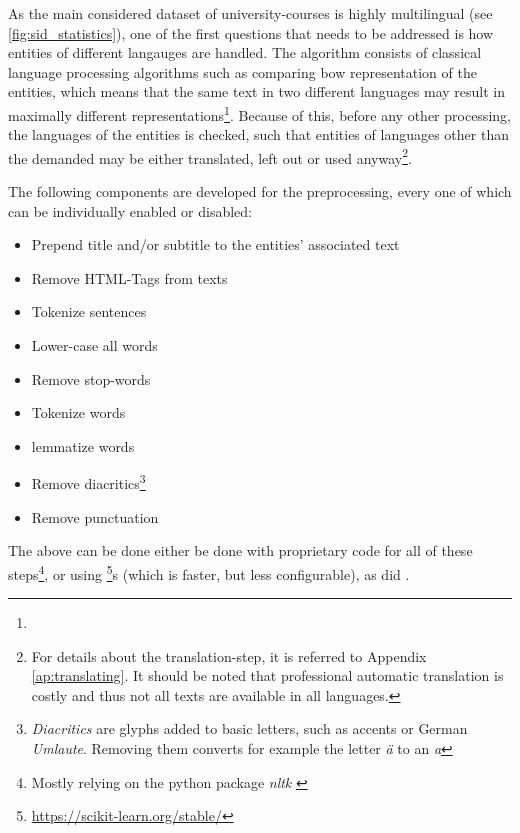 As the main considered dataset of university-courses is highly multilingual (see \autoref{fig:sid_statistics}), one of the first questions that needs to be addressed is how entities of different langauges are handled. The algorithm consists of classical language processing algorithms such as comparing \gls{bow} representation of the entities, which means that the same text in two different languages may result in maximally different representations\footnote{}. Because of this, before any other processing, the languages of the entities is checked, such that entities of languages other than the demanded may be either translated, left out or used anyway\footnote{For details about the translation-step, it is referred to Appendix \ref{ap:translating}. It should be noted that professional automatic translation is costly and thus not all texts are available in all languages.}.


The following components are developed for the preprocessing, every one of which can be individually enabled or disabled:
\begin{itemize}
	\item Prepend title and/or subtitle to the entities' associated text 
	\item Remove HTML-Tags from texts 
	\item Tokenize sentences 
	\item Lower-case all words
	\item Remove stop-words
	\item Tokenize words
	\item \Gls{lemma}tize words
	\item Remove diacritics\footnote{\emph{Diacritics} are glyphs added to basic letters, such as accents or German \emph{Umlaute}. Removing them converts for example the letter \emph{ä} to an \emph{a}}
	\item Remove punctuation 
\end{itemize}

The above can be done either be done with proprietary code for all of these steps\footnote{Mostly relying on the python package \emph{nltk} \cite{bird2009natural}}, or using \footnote{\url{https://scikit-learn.org/stable/}}s  (which is faster, but less configurable), as did \cite{Ager2018}.



